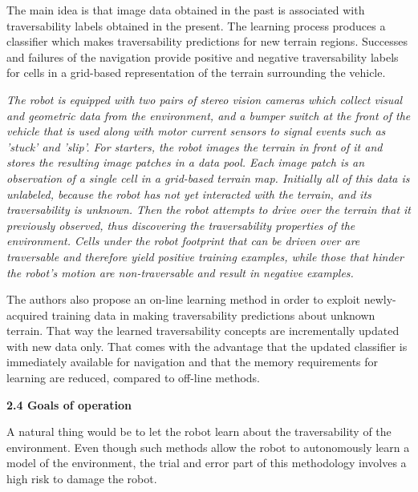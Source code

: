 \documentclass[12pt,a4paper]{report}
\begin{document}
	The main idea is that image data  obtained in the past is associated with 
	traversability labels obtained in the  present. The learning process produces a 
	classifier which makes traversability  predictions for new terrain regions. 
	Successes and failures of the navigation provide positive and negative 
	traversability labels for cells in a grid-based representation of the terrain surrounding 
	the vehicle.
	
	\textit{The robot is equipped with two pairs of stereo vision cameras which 
	collect visual and geometric data from the environment, and a bumper switch
	at the front of the vehicle that is used along with motor current sensors to 
	signal events such as ’stuck’ and ’slip’.
	For starters, the robot images the terrain in front of it and stores the 
	resulting image patches in a data pool. Each image patch is an observation 
	of a single cell in a grid-based terrain map. Initially all of this data is 
	unlabeled, because the robot has not yet interacted with the terrain, and its 
	traversability is unknown. 
	\newline
	Then the robot attempts to drive over the terrain that it previously 
	observed, thus discovering the traversability properties of the environment. 
	Cells under the robot footprint that can be driven over are traversable and 
	therefore yield positive training examples, while those that hinder the robot’s 
	motion are non-traversable	and result in negative examples.}
	
	The authors also propose an on-line learning method in order to exploit 
	newly-acquired training data in making traversability predictions about 
	unknown terrain. That way the learned traversability concepts are 
	incrementally updated with new data only. That comes with the advantage that the 
	updated classifier is immediately available for navigation and that the 
	memory requirements for learning are reduced, compared to off-line methods.
	\newline\newline
	
	\large\textbf{2.4 Goals of operation}
	\normalsize\newline
	
	A natural thing would be to let the robot learn about the 
	traversability of the environment. Even though such methods allow the robot to 
	autonomously learn a model of the environment, the trial and error part of this 
	methodology involves a high risk to damage the robot.
	\newline\newline
	
\end{document}
